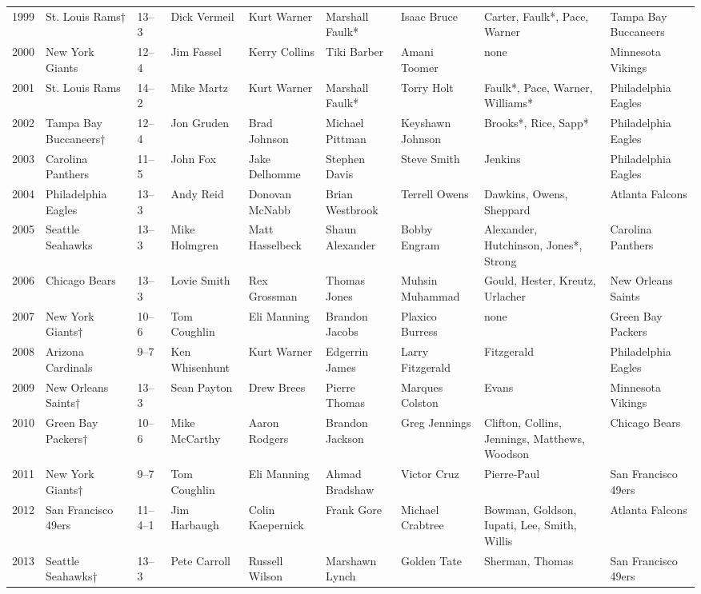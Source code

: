 \documentclass{article}
\begin{document}
\begin{tabular}{lllllllll}
1999 & St. Louis Rams† & 13–3 & Dick Vermeil & Kurt Warner & Marshall Faulk* & Isaac Bruce & Carter, Faulk*, Pace, Warner & Tampa Bay Buccaneers \\
2000 & New York Giants & 12–4 & Jim Fassel & Kerry Collins & Tiki Barber & Amani Toomer & none & Minnesota Vikings \\
2001 & St. Louis Rams & 14–2 & Mike Martz & Kurt Warner & Marshall Faulk* & Torry Holt & Faulk*, Pace, Warner, Williams* & Philadelphia Eagles \\
2002 & Tampa Bay Buccaneers† & 12–4 & Jon Gruden & Brad Johnson & Michael Pittman & Keyshawn Johnson & Brooks*, Rice, Sapp* & Philadelphia Eagles \\
2003 & Carolina Panthers & 11–5 & John Fox & Jake Delhomme & Stephen Davis & Steve Smith & Jenkins & Philadelphia Eagles \\
2004 & Philadelphia Eagles & 13–3 & Andy Reid & Donovan McNabb & Brian Westbrook & Terrell Owens & Dawkins, Owens, Sheppard & Atlanta Falcons \\
2005 & Seattle Seahawks & 13–3 & Mike Holmgren & Matt Hasselbeck & Shaun Alexander & Bobby Engram & Alexander, Hutchinson, Jones*, Strong & Carolina Panthers \\
2006 & Chicago Bears & 13–3 & Lovie Smith & Rex Grossman & Thomas Jones & Muhsin Muhammad & Gould, Hester, Kreutz, Urlacher & New Orleans Saints \\
2007 & New York Giants† & 10–6 & Tom Coughlin & Eli Manning & Brandon Jacobs & Plaxico Burress & none & Green Bay Packers \\
2008 & Arizona Cardinals & 9–7 & Ken Whisenhunt & Kurt Warner & Edgerrin James & Larry Fitzgerald & Fitzgerald & Philadelphia Eagles \\
2009 & New Orleans Saints† & 13–3 & Sean Payton & Drew Brees & Pierre Thomas & Marques Colston & Evans & Minnesota Vikings \\
2010 & Green Bay Packers† & 10–6 & Mike McCarthy & Aaron Rodgers & Brandon Jackson & Greg Jennings & Clifton, Collins, Jennings, Matthews, Woodson & Chicago Bears \\
2011 & New York Giants† & 9–7 & Tom Coughlin & Eli Manning & Ahmad Bradshaw & Victor Cruz & Pierre-Paul & San Francisco 49ers \\
2012 & San Francisco 49ers & 11–4–1 & Jim Harbaugh & Colin Kaepernick & Frank Gore & Michael Crabtree & Bowman, Goldson, Iupati, Lee, Smith, Willis & Atlanta Falcons \\
2013 & Seattle Seahawks† & 13–3 & Pete Carroll & Russell Wilson & Marshawn Lynch & Golden Tate & Sherman, Thomas & San Francisco 49ers \\
\bottomrule
\end{tabular}
\end{document}
